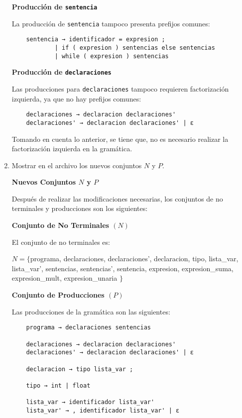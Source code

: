\documentclass{article}
\begin{document}
\begin{enumerate}
    \textbf{Producción de \texttt{sentencia}}

    La producción de \texttt{sentencia} tampoco presenta prefijos comunes:

    \begin{verbatim}
    sentencia → identificador = expresion ;
            | if ( expresion ) sentencias else sentencias
            | while ( expresion ) sentencias
    \end{verbatim}

    \textbf{Producción de \texttt{declaraciones}}

    Las producciones para \texttt{declaraciones} tampoco requieren factorización izquierda, ya que no hay prefijos comunes:

    \begin{verbatim}
    declaraciones → declaracion declaraciones'
    declaraciones' → declaracion declaraciones' | ε
    \end{verbatim}

    Tomando en cuenta lo anterior, se tiene que, no es necesario realizar la factorización izquierda en la gramática.

    \item Mostrar en el archivo los nuevos conjuntos $N$ y $P$.

    \textbf{Nuevos Conjuntos $N$ y $P$}

    Después de realizar las modificaciones necesarias, los conjuntos de no terminales y producciones son los siguientes:

    \textbf{Conjunto de No Terminales $(N)$}

    El conjunto de no terminales es:

    $ N = \{ $programa, declaraciones, declaraciones', declaracion, tipo, lista\_var, lista\_var', sentencias, sentencias', sentencia, expresion, expresion\_suma, expresion\_mult, expresion\_unaria $ \} $

    \textbf{Conjunto de Producciones $(P)$}

    Las producciones de la gramática son las siguientes:

    \begin{verbatim}
    programa → declaraciones sentencias

    declaraciones → declaracion declaraciones'
    declaraciones' → declaracion declaraciones' | ε

    declaracion → tipo lista_var ;

    tipo → int | float

    lista_var → identificador lista_var'
    lista_var' → , identificador lista_var' | ε


\end{verbatim}
\end{enumerate}
\end{document}
